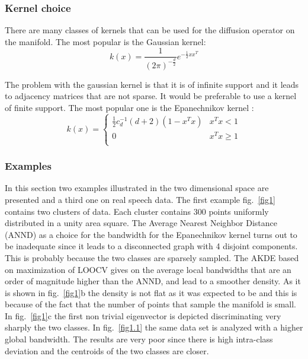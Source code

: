 \documentclass[12pt,letterpaper,doublespaced,ETD,dvips,proposal]{gtthesis}
\begin{document}
\begin{Body}
\subsubsection{Kernel choice} There are many classes of kernels that
can be used for the diffusion operator on the manifold. The most
popular is the Gaussian kernel:
\[
    k(x)=\frac{1}{(2\pi)^{-\frac{d}{2}}}e^{-\frac{1}{2}xx^T}
\]

The problem with the gaussian kernel is that it is of infinite
support and it leads to adjacency matrices that are not sparse. It
would be preferable to use a kernel of finite support. The most
popular one is the Epanechnikov kernel \cite{Silverman}:
\begin{equation}
    k(x)=\left\{
    \begin{array}{ll}
        \frac{1}{2}c_{d}^{-1}(d+2)(1-x^Tx) &  x^Tx<1 \\
        0   &   x^Tx\geq 1 \\
    \end{array}
 \right.
\end{equation}

\subsubsection{Examples} In this section two examples illustrated in
the two dimensional space are presented and a third one on real
speech data. The first example fig.~\ref{fig1} contains two clusters
of data. Each cluster contains 300 points uniformly distributed in a
unity area square. The Average Nearest Neighbor Distance (ANND) as a
choice for the bandwidth for the Epanechnikov kernel turns out to be
inadequate since it leads to a disconnected graph with 4 disjoint
components. This is probably because the two classes are sparsely
sampled. The AKDE based on maximization of LOOCV gives on the
average local bandwidths that are an order of magnitude higher than
the ANND, and lead to a smoother density. As it is shown in
fig.~\ref{fig1}b the density is not flat as it was expected to be
and this is because of the fact that the number of points that
sample the manifold is small. In fig.~\ref{fig1}c the first non
trivial eigenvector is depicted discriminating very sharply the two
classes. In fig.~\ref{fig1.1} the same data set is analyzed with a
higher global bandwidth. The results are very poor since there is
high intra-class deviation and the centroids of the two classes are
closer.


\end{Body}
\end{document}
